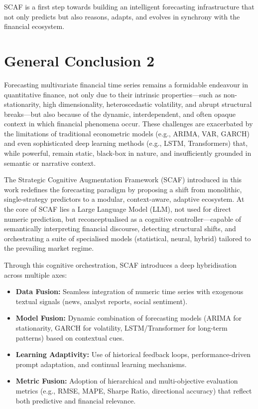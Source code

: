 \documentclass[conference]{IEEEtran}
\begin{document}
SCAF is a first step towards building an intelligent forecasting infrastructure that not only predicts but also reasons, adapts, and evolves in synchrony with the financial ecosystem.
\section{General Conclusion 2}

Forecasting multivariate financial time series remains a formidable endeavour in quantitative finance, not only due to their intrinsic properties—such as non-stationarity, high dimensionality, heteroscedastic volatility, and abrupt structural breaks—but also because of the dynamic, interdependent, and often opaque context in which financial phenomena occur. These challenges are exacerbated by the limitations of traditional econometric models (e.g., ARIMA, VAR, GARCH) and even sophisticated deep learning methods (e.g., LSTM, Transformers) that, while powerful, remain static, black-box in nature, and insufficiently grounded in semantic or narrative context.

The Strategic Cognitive Augmentation Framework (SCAF) introduced in this work redefines the forecasting paradigm by proposing a shift from monolithic, single-strategy predictors to a modular, context-aware, adaptive ecosystem. At the core of SCAF lies a Large Language Model (LLM), not used for direct numeric prediction, but reconceptualised as a cognitive controller—capable of semantically interpreting financial discourse, detecting structural shifts, and orchestrating a suite of specialised models (statistical, neural, hybrid) tailored to the prevailing market regime.

Through this cognitive orchestration, SCAF introduces a deep hybridisation across multiple axes:
\begin{itemize}
  \item \textbf{Data Fusion:} Seamless integration of numeric time series with exogenous textual signals (news, analyst reports, social sentiment).
  \item \textbf{Model Fusion:} Dynamic combination of forecasting models (ARIMA for stationarity, GARCH for volatility, LSTM/Transformer for long-term patterns) based on contextual cues.
  \item \textbf{Learning Adaptivity:} Use of historical feedback loops, performance-driven prompt adaptation, and continual learning mechanisms.
  \item \textbf{Metric Fusion:} Adoption of hierarchical and multi-objective evaluation metrics (e.g., RMSE, MAPE, Sharpe Ratio, directional accuracy) that reflect both predictive and financial relevance.
\end{itemize}
\end{document}

